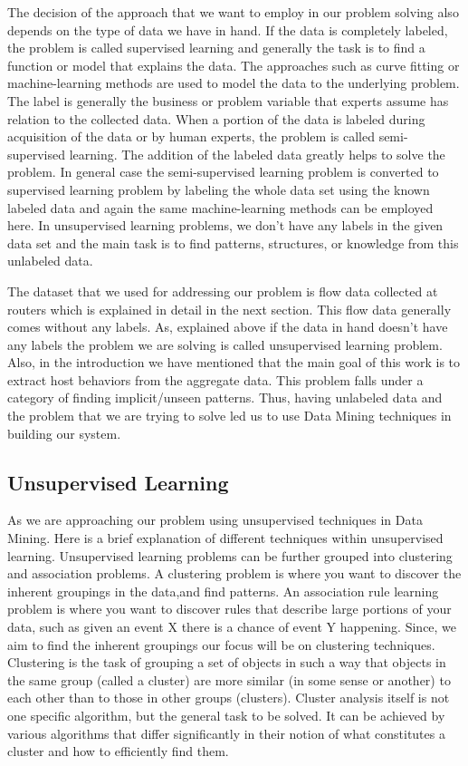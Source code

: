 The decision of the approach that we want to employ in our problem solving also depends on the type of data we have in hand. If the data is completely labeled, the problem is called supervised learning and generally the task is to find a function or model that explains the data. The approaches such as curve fitting or machine-learning methods are used to model the data to the underlying problem. The label is generally the business or problem variable that experts assume has relation to the collected data.  When a portion of the data is labeled during acquisition of the data or by human experts, the problem is called semi-supervised learning. The addition of the labeled data greatly helps to solve the problem. In general case the semi-supervised learning problem is converted to supervised learning problem by labeling the whole data set using the known labeled data and again the same machine-learning methods can be employed here. In unsupervised learning problems, we don't have any labels in the given data set and the main task is to find patterns, structures, or knowledge from this unlabeled data.   

The dataset that we used for addressing our problem is flow data collected at routers which is explained in detail in the next section. This flow data generally comes without any labels. As, explained above if the data in hand doesn't have any labels the problem we are solving is called unsupervised learning problem. Also, in the introduction we have mentioned that the main goal of this work is to extract host behaviors from the aggregate data. This problem falls under a category of finding implicit/unseen patterns. Thus, having unlabeled data and the problem that we are trying to solve led us to use Data Mining techniques in building our system.

\subsection{Unsupervised Learning}  \label{unsupervised}
As we are approaching our problem using unsupervised techniques in Data Mining. Here is a brief explanation of different techniques within unsupervised learning.
Unsupervised learning problems can be further grouped into clustering and association problems. A clustering problem is where you want to discover the inherent groupings in the data,and find patterns. An association rule learning problem is where you want to discover rules that describe large portions of your data, such as given an event X there is a chance of event Y happening. Since, we aim to find the inherent groupings our focus will be on clustering techniques. Clustering is the task of grouping a set of objects in such a way that objects in the same group (called a cluster) are more similar (in some sense or another) to each other than to those in other groups (clusters). Cluster analysis itself is not one specific algorithm, but the general task to be solved. It can be achieved by various algorithms that differ significantly in their notion of what constitutes a cluster and how to efficiently find them.

